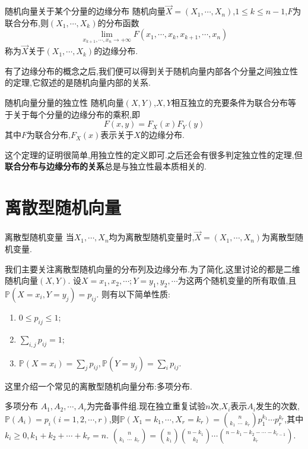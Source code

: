 \begin{definition}{随机向量关于某个分量的边缘分布}{}
    随机向量$\overrightarrow{X}=(X_1,\cdots,X_n)$,$1\leq k\leq n-1$,$F$为联合分布,则$(X_1,\cdots,X_k)$的分布函数
    $$\lim_{x_{k+1},\cdots,x_n\to +\infty}F(x_1,\cdots,x_k,x_{k+1},\cdots,x_n)$$
    称为$\overrightarrow{X}$关于$(X_1,\cdots,X_k)$的边缘分布.
\end{definition}

有了边缘分布的概念之后,我们便可以得到关于随机向量内部各个分量之间独立性的定理,它叙述的是随机向量内部的关系.

\begin{theorem}{随机向量分量的独立性}{}
    随机向量$(X,Y)$,$X,Y$相互独立的充要条件为联合分布等于关于每个分量的边缘分布的乘积,即
    $$F(x,y)=F_X(x)F_Y(y)$$
    其中$F$为联合分布,$F_X(x)$表示关于$X$的边缘分布.
\end{theorem}

这个定理的证明很简单,用独立性的定义即可.之后还会有很多判定独立性的定理,但\textbf{联合分布与边缘分布的关系}总是与独立性最本质相关的.
\section{离散型随机向量}
\begin{definition}{离散型随机变量}{}
    当$X_1,\cdots,X_n$均为离散型随机变量时,$\overrightarrow{X}=(X_1,\cdots,X_n)$为离散型随机变量.
\end{definition}
我们主要关注离散型随机向量的分布列及边缘分布.为了简化,这里讨论的都是二维随机向量$(X,Y)$.
设$X=x_1,x_2,\cdots;Y=y_1,y_2,\cdots$为这两个随机变量的所有取值,且$\mathbb{P}(X=x_i,Y=y_j)=p_{ij}$.
则有以下简单性质:
\begin{enumerate}
    \item $0\leq p_{ij}\leq 1$;
    \item $\sum_{i,j}p_{ij}=1$;
    \item $\mathbb{P}(X=x_i)=\sum_{j}p_{ij},\mathbb{P}(Y=y_j)=\sum_{i}p_{ij}$.
\end{enumerate}

这里介绍一个常见的离散型随机向量分布:多项分布.
\begin{definition}{多项分布}{}
    $A_1,A_2,\cdots,A_r$为完备事件组.现在独立重复试验$n$次,$X_i$表示$A_i$发生的次数,
    $\mathbb{P}(A_i)=p_i(i=1,2,\cdots,r)$,则$\mathbb{P}(X_1=k_1,\cdots,X_r=k_r)=\binom{n}{k_1\ \ \cdots \ \ k_r} p_1^{k_1}\cdots p_r^{k_r}$,其中$k_i\geq 0,k_1+k_2+\cdots+k_r=n$.
    $\binom{n}{k_1\ \ \cdots \ \ k_r}=\binom{n}{k_1}\binom{n-k_1}{k_2}\cdots\binom{n-k_1-k_2-\cdots-k_{r-1}}{k_r}$.
\end{definition}

